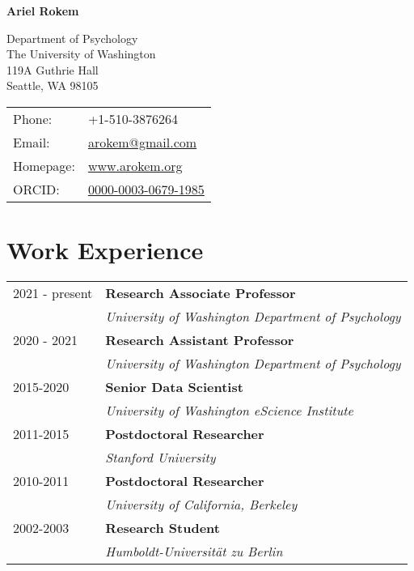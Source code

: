 \documentclass[11pt,fullpage]{article}
\def\name{Ariel Rokem}
\begin{document}
%

\centerline{\Large \bf \name}

\vspace{0.25in}

\begin{minipage}{0.50\linewidth}
  Department of Psychology\\
  The University of Washington\\
  119A Guthrie Hall\\
  Seattle, WA 98105\\
\end{minipage}
\begin{minipage}{0.50\linewidth}
  \begin{tabular}{ll}
    Phone: & +1-510-3876264 \\
    Email: & \href{mailto:arokem@gmail.com}{arokem@gmail.com} \\
    Homepage: & \href{http://arokem.org/}{www.arokem.org} \\
    ORCID: & \href{http://orcid.org/0000-0003-0679-1985}{0000-0003-0679-1985} \\
  \end{tabular}
\end{minipage}

\section*{Work Experience}
\begin{tabular}{ll}

  2021 -  present & {\bf Research Associate Professor} \\ & \emph{University of Washington Department of Psychology}\\
  2020 - 2021 & {\bf Research Assistant Professor} \\ & \emph{University of Washington Department of Psychology}\\
  2015-2020 & {\bf Senior Data Scientist}\\ & \emph{University of Washington eScience Institute}\\
  2011-2015 & {\bf Postdoctoral Researcher}\\ & \emph{Stanford University}\\
  2010-2011 & {\bf Postdoctoral Researcher}\\ & \emph{University of California, Berkeley}\\
  2002-2003 & {\bf Research Student}\\ & \emph{Humboldt-Universit\"{a}t zu Berlin}\\

\end{tabular}
\end{document}
